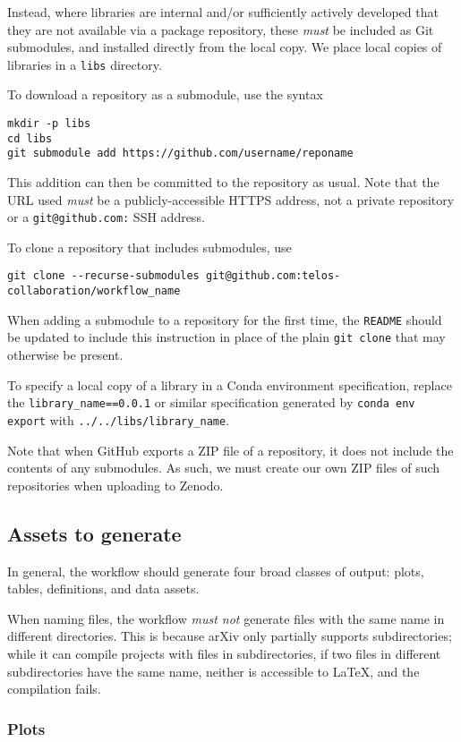 \documentclass{article}
\newcommand\rfcword[1]{\emph{#1}\xspace}
\newcommand\must{\rfcword{must}}
\newcommand\mustnot{\rfcword{must not}}
\newcommand\filename[1]{\texttt{#1}\xspace}
\newcommand\readme{\filename{README}\xspace}
\begin{document}
Instead,
where libraries are internal and/or sufficiently actively developed that
they are not available via a package repository,
these \must be included as Git submodules,
and installed directly from the local copy.
We place local copies of libraries in a \filename{libs} directory.

To download a repository as a submodule,
use the syntax
\begin{verbatim}
mkdir -p libs
cd libs
git submodule add https://github.com/username/reponame
\end{verbatim}
This addition can then be committed to the repository as usual.
Note that the URL used \must be a publicly-accessible HTTPS address,
not a private repository or a \texttt{git@github.com:} SSH address.

To clone a repository that includes submodules,
use
\begin{verbatim}
git clone --recurse-submodules git@github.com:telos-collaboration/workflow_name
\end{verbatim}
When adding a submodule to a repository for the first time,
the \readme should be updated to include this instruction in place of
the plain \texttt{git clone} that may otherwise be present.

To specify a local copy of a library in a Conda environment specification,
replace the \verb|library_name==0.0.1| or similar specification
generated by \texttt{conda env export}
with \verb|../../libs/library_name|.

Note that when GitHub exports a ZIP file of a repository,
it does not include the contents of any submodules.
As such,
we must create our own ZIP files of such repositories when uploading to Zenodo.

\subsection{Assets to generate}\label{sec:assets}

In general,
the workflow should generate four broad classes of output:
plots,
tables,
definitions,
and data assets.

When naming files,
the workflow \mustnot generate files with the same name in different directories.
This is because arXiv only partially supports subdirectories;
while it can compile projects with files in subdirectories,
if two files in different subdirectories have the same name,
neither is accessible to LaTeX,
and the compilation fails.

\subsubsection{Plots}
\end{document}
